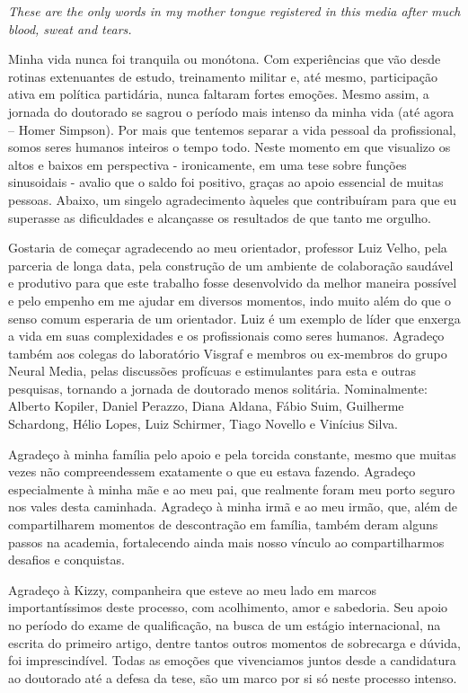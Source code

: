 \textit{These are the only words in my mother tongue registered in this media after much blood, sweat and tears.}

Minha vida nunca foi tranquila ou monótona. Com experiências que vão desde rotinas extenuantes de estudo, treinamento militar e, até mesmo, participação ativa em política partidária, nunca faltaram fortes emoções. Mesmo assim, a jornada do doutorado se sagrou o período mais intenso da minha vida (até agora – Homer Simpson). Por mais que tentemos separar a vida pessoal da profissional, somos seres humanos inteiros o tempo todo. Neste momento em que visualizo os altos e baixos em perspectiva - ironicamente, em uma tese sobre funções sinusoidais - avalio que o saldo foi positivo, graças ao apoio essencial de muitas pessoas. Abaixo, um singelo agradecimento àqueles que contribuíram para que eu superasse as dificuldades e alcançasse os resultados de que tanto me orgulho.

Gostaria de começar agradecendo ao meu orientador, professor Luiz Velho, pela parceria de longa data, pela construção de um ambiente de colaboração saudável e produtivo para que este trabalho fosse desenvolvido da melhor maneira possível e pelo empenho em me ajudar em diversos momentos, indo muito além do que o senso comum esperaria de um orientador. Luiz é um exemplo de líder que enxerga a vida em suas complexidades e os profissionais como seres humanos. Agradeço também aos colegas do laboratório Visgraf e membros ou ex-membros do grupo Neural Media, pelas discussões profícuas e estimulantes para esta e outras pesquisas, tornando a jornada de doutorado menos solitária. Nominalmente: Alberto Kopiler, Daniel Perazzo, Diana Aldana, Fábio Suim, Guilherme Schardong, Hélio Lopes, Luiz Schirmer, Tiago Novello e Vinícius Silva.

Agradeço à minha família pelo apoio e pela torcida constante, mesmo que muitas vezes não compreendessem exatamente o que eu estava fazendo. Agradeço especialmente à minha mãe e ao meu pai, que realmente foram meu porto seguro nos vales desta caminhada. Agradeço à minha irmã e ao meu irmão, que, além de compartilharem momentos de descontração em família, também deram alguns passos na academia, fortalecendo ainda mais nosso vínculo ao compartilharmos desafios e conquistas.

Agradeço à Kizzy, companheira que esteve ao meu lado em marcos importantíssimos deste processo, com acolhimento, amor e sabedoria. Seu apoio no período do exame de qualificação, na busca de um estágio internacional, na escrita do primeiro artigo, dentre tantos outros momentos de sobrecarga e dúvida, foi imprescindível. Todas as emoções que vivenciamos juntos desde a candidatura ao doutorado até a defesa da tese, são um marco por si só neste processo intenso.

